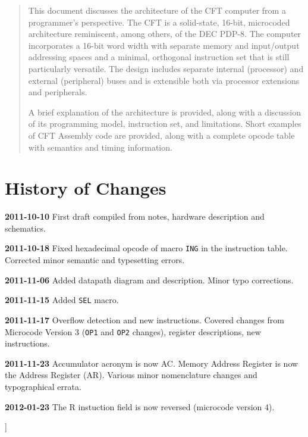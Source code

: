 \documentclass[11pt,a4paper,twocolumns]{article}
\newcommand\register[1]{\textsf{#1}}
\newcommand\A{\register{AC}}
\newcommand\AR{\register{AR}}
\begin{document}
\begin{minipage}{.75\textwidth}
  \begin{abstract}
    \small
    
  This document discusses the architecture of the CFT computer from a
  programmer's perspective. The CFT is a solid-state, 16-bit,
  microcoded architecture reminiscent, among others, of the DEC
  PDP-8. The computer incorporates a 16-bit word width with separate
  memory and input/output addressing spaces and a minimal, orthogonal
  instruction set that is still particularly versatile. The design
  includes separate internal (processor) and external (peripheral)
  buses and is extensible both via processor extensions and
  peripherals.

  A brief explanation of the architecture is provided, along with a
  discussion of its programming model, instruction set, and
  limitations. Short examples of CFT Assembly code are provided, along
  with a complete opcode table with semantics and timing information.
    
  \end{abstract}
  
  \section*{History of Changes}
  \small

  {\bf 2011-10-10} First draft compiled from notes, hardware description
  and schematics.

  {\bf 2011-10-18} Fixed hexadecimal opcode of macro {\tt ING} in the
  instruction table. Corrected minor semantic and typesetting errors.
  
  {\bf 2011-11-06} Added datapath diagram and description. Minor typo
  corrections.

  {\bf 2011-11-15} Added {\tt SEL} macro.

  {\bf 2011-11-17} Overflow detection and new instructions. Covered
  changes from Microcode Version 3 ({\tt OP1} and {\tt OP2} changes),
  register descriptions, new instructions.

  {\bf 2011-11-23} Accumulator acronym is now \A. Memory Address
  Register is now the Address Register (\AR). Various minor
  nomenclature changes and typographical errata.

  {\bf 2012-01-23} The {\sf R} instuction field is now reversed
  (microcode version 4).

  \vspace{5ex}
  
\end{minipage}
] %
\end{document}
